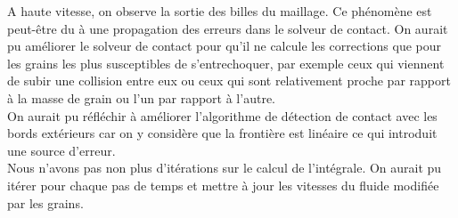 \documentclass{article}
\theoremstyle{definition}
\begin{document}
A haute vitesse, on observe la sortie des billes du maillage. Ce phénomène est peut-être du à une propagation des erreurs dans le solveur de contact. On aurait pu améliorer le solveur de contact pour qu'il ne calcule les corrections que pour les grains les plus susceptibles de s'entrechoquer, par exemple ceux qui viennent de subir une collision entre eux ou ceux qui sont relativement proche par rapport à la masse de grain ou l'un par rapport à l'autre. \\

On aurait pu réfléchir à améliorer l'algorithme de détection de contact avec les bords extérieurs car on y considère que la frontière est linéaire ce qui introduit une source d'erreur. \\


Nous n'avons pas non plus d'itérations sur le calcul de l'intégrale. On aurait pu itérer pour chaque pas de temps et mettre à jour les vitesses du fluide modifiée par les grains. \\
\end{document}
